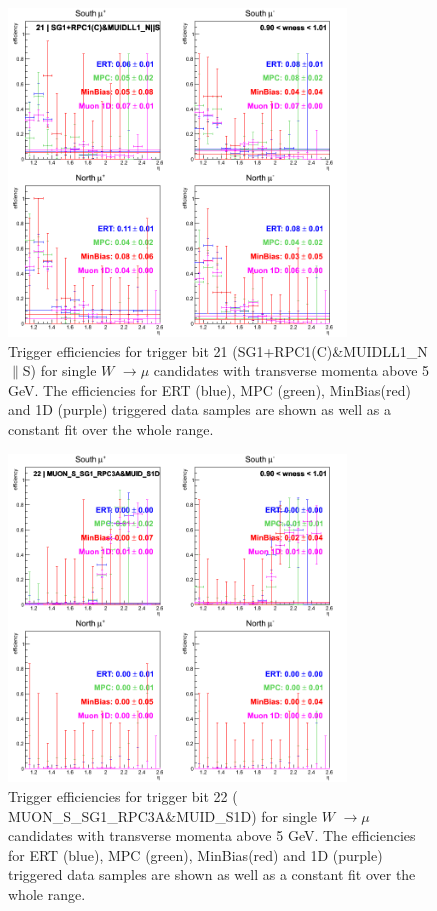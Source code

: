 \begin{figure}[ht]
\begin{center}
\includegraphics[width=0.8\textwidth]{./figures/run13_trigeffieta_w1_trig21_lin.png}
\caption{\label{fig:run13_trigeffieta_w0_nper0_trig21_lin} Trigger efficiencies for trigger bit 21 (SG1+RPC1(C)\&MUIDLL1\_N$\|$S) for single $W$ $\rightarrow \mu$ candidates with transverse momenta above 5 GeV. The efficiencies for ERT (blue), MPC (green), MinBias(red) and 1D (purple) triggered data samples are shown as well as a constant fit over the whole range.}
\end{center}
\end{figure}
\clearpage
\begin{figure}[ht]
\begin{center}
\includegraphics[width=0.8\textwidth]{./figures/run13_trigeffieta_w1_trig22_lin.png}
\caption{\label{fig:run13_trigeffieta_w0_nper0_trig22_lin} Trigger efficiencies for trigger bit 22 ( MUON\_S\_SG1\_RPC3A\&MUID\_S1D) for single $W$ $\rightarrow \mu$ candidates with transverse momenta above 5 GeV. The efficiencies for ERT (blue), MPC (green), MinBias(red) and 1D (purple) triggered data samples are shown as well as a constant fit over the whole range.}
\end{center}
\end{figure}
